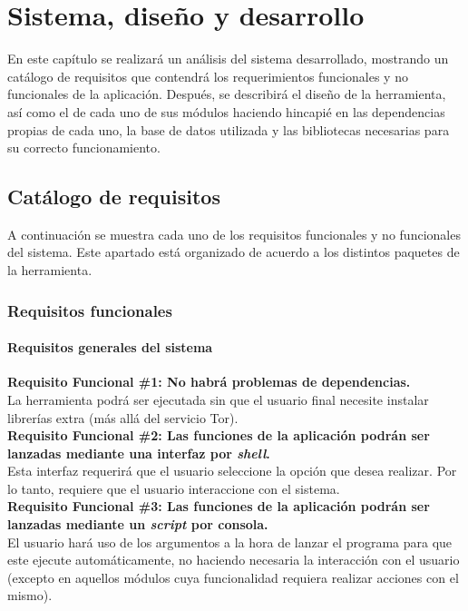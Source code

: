 \chapter{Sistema, diseño y desarrollo}
\label{chap:sistemadesarrollado}

En este capítulo se realizará un análisis del sistema desarrollado, mostrando un catálogo de requisitos que contendrá los requerimientos funcionales y no funcionales de la aplicación.
Después, se describirá el diseño de la herramienta, así como el de cada  uno  de  sus módulos haciendo hincapié en las dependencias propias de cada uno, la base de datos utilizada y las bibliotecas necesarias para su correcto funcionamiento.

\section{Catálogo de requisitos}

A continuación se muestra cada uno de los requisitos funcionales y no funcionales del sistema. Este apartado está organizado de acuerdo a los distintos paquetes de la herramienta.

\subsection{Requisitos funcionales}
\subsubsection{Requisitos generales del sistema}
\begin{adjustwidth}{0.5cm}{}
\textbf{Requisito Funcional \#1: No habrá problemas de dependencias.}\\
La herramienta podrá ser ejecutada sin que el usuario final necesite instalar librerías extra (más allá del servicio Tor).\\
\linebreak
\textbf{Requisito Funcional \#2: Las funciones de la aplicación podrán ser lanzadas mediante una interfaz por \textit{shell}.}\\
Esta interfaz requerirá que el usuario seleccione la opción que desea realizar. Por lo tanto, requiere que el usuario interaccione con el sistema.\\	
\linebreak
\textbf{Requisito Funcional \#3: Las funciones de la aplicación podrán ser lanzadas mediante un \textit{script} por consola.}\\
El usuario hará uso de los argumentos a la hora de lanzar el programa para que este ejecute automáticamente, no haciendo necesaria la interacción con el usuario (excepto en aquellos módulos cuya funcionalidad requiera realizar acciones con el mismo).\\
\linebreak
\end{adjustwidth}
